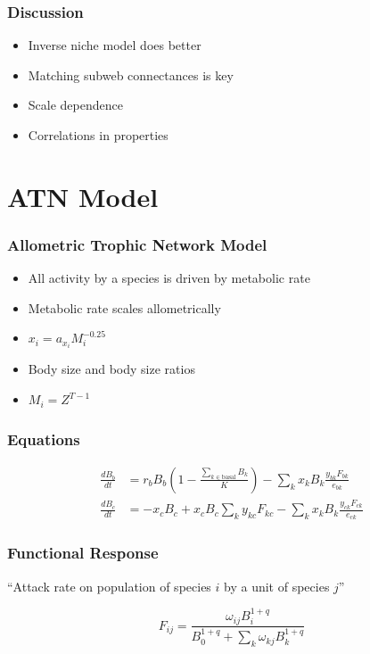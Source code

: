\documentclass[table]{beamer}
\begin{document}
\begin{frame}
    \frametitle{Discussion}
    \begin{itemize}[<+->]
        \item Inverse niche model does better
        \item Matching subweb connectances is key
        \item Scale dependence
        \item Correlations in properties
    \end{itemize}
\end{frame}

\section{ATN Model}

\begin{frame}
    \frametitle{Allometric Trophic Network Model} 
    \begin{itemize}[<+->]
        \item All activity by a species is driven by metabolic rate
        \item Metabolic rate scales allometrically
        \item $x_i = a_{x_i}M_i^{-0.25}$
        \item Body size and body size ratios
        \item $M_i = Z^{T-1}$
    \end{itemize}
\end{frame}


\begin{frame}
    \frametitle{Equations} 
    \begin{align}
        \frac{dB_{b}}{dt} &= r_bB_b\left(1-\frac{\sum_{k\in\text{basal}}B_k}{K}\right) - \sum_kx_kB_k\frac{y_{bk}F_{bk}}{e_{bk}}\\ 
        \frac{dB_{c}}{dt} &= -x_cB_c + x_cB_c\sum_ky_{kc}F_{kc} - \sum_k x_kB_k\frac{y_{ck}F_{ck}}{e_{ck}}
    \end{align}
\end{frame}

\begin{frame}
    \frametitle{Functional Response}
    ``Attack rate on population of species $i$ by a unit of species $j$''

    \[
        F_{ij} = \frac{\omega_{ij}B_i^{1+q}}{B_0^{1+q} + \sum_k\omega_{kj}B_k^{1+q}}
    \]
\end{frame}
\end{document}
